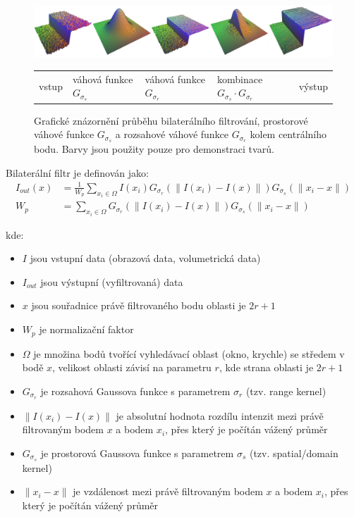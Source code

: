 \begin{figure} [H]
    \centering
    \label{fig:bl:desc}
    \includegraphics[width=1\textwidth]{figures/bf-dsc.png}
    \begin{tabularx}{1\textwidth}{
        >{\centering}X
        >{\centering}X
        >{\centering}X
        >{\centering}X
        >{\centering}X } 
        vstup & váhová funkce $G_{\sigma_s}$ & váhová funkce $G_{\sigma_r}$ & kombinace $G_{\sigma_s} \cdot G_{\sigma_r}$ & výstup
    \end{tabularx}
    \caption{Grafické znázornění průběhu bilaterálního filtrování, prostorové váhové funkce $G_{\sigma_s}$ a rozsahové váhové funkce $G_{\sigma_r}$ kolem centrálního bodu. Barvy jsou použity pouze pro demonstraci tvarů. }
\end{figure}

Bilaterální filtr je definován jako:
\begin{align}
    \label{eq:bf}
    I_{out}(x) &= \frac{1}{W_p}\displaystyle\sum_{x_i\in\Omega}I(x_i)G_{\sigma_r}(\|I(x_i)-I(x)\|)G_{\sigma_s}(\|x_i-x\|) \\
    W_p &= \displaystyle\sum_{x_i\in\Omega}G_{\sigma_r}(\|I(x_i)-I(x)\|)G_{\sigma_s}(\|x_i-x\|)
\end{align}

kde:
\begin{itemize}
    \item $I$ jsou vstupní data (obrazová data, volumetrická data)
    \item $I_{out}$ jsou výstupní (vyfiltrovaná) data
    \item $x$ jsou souřadnice právě filtrovaného bodu
    oblasti je $2r+1$
    \item $W_p$ je normalizační faktor
    \item $\Omega$ je množina bodů tvořící vyhledávací oblast (okno, krychle) se středem v bodě $x$, velikost oblasti závisí na parametru $r$, kde strana oblasti je $2r+1$
    \item $G_{\sigma_r}$ je rozsahová Gaussova funkce s parametrem $\sigma_r$ (tzv. range kernel)
    \item $\|I(x_i)-I(x)\|$ je absolutní hodnota rozdílu intenzit mezi právě filtrovaným bodem $x$ a bodem $x_i$, přes který je počítán vážený průměr
    \item $G_{\sigma_s}$ je prostorová Gaussova funkce s parametrem $\sigma_s$ (tzv. spatial/domain kernel)
    \item $\|x_i-x\|$ je  vzdálenost mezi právě filtrovaným bodem $x$ a bodem $x_i$, přes který je počítán vážený průměr
\end{itemize}

